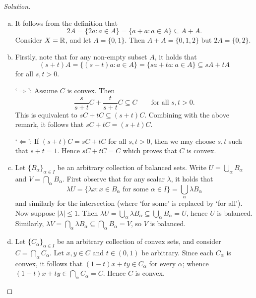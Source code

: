 \begin{proof}[Solution]
	\begin{enumerate}[(a)]
		\item It follows from the definition that
		\begin{equation*}
			2A = \{ 2a : a \in A \} = \{ a+a : a \in A \} \subseteq A+A.
		\end{equation*}
		Consider $X = \mathbb{R}$, and let $A = \{0, 1\}$. Then $A+A = \{0,1,2 \}$ but $2A = \{0,2\}$.
		
		\item Firstly, note that for any non-empty subset $A$, it holds that
		\begin{equation*}
			(s+t)A = \{ (s+t)a : a \in A \} = \{ sa + ta : a \in A \} \subseteq sA + tA
		\end{equation*}
		for all $s,t>0$.
		
		`$\Rightarrow$': Assume $C$ is convex. Then
		\begin{equation*}
			\frac{s}{s+t}C + \frac{t}{s+t}C \subseteq C \qquad \text{for all } s,t>0.
		\end{equation*}
		This is equivalent to $sC + tC \subseteq (s+t)C$. Combining with the above remark, it follows that $sC + tC = (s+t)C$.
		
		`$\Leftarrow$': If $(s+t)C = sC + tC$ for all $s,t>0$, then we may choose $s,t$ such that $s+t=1$. Hence $sC + tC = C$ which proves that $C$ is convex.
		
		\item Let $\{ B_\alpha \}_{\alpha \in I}$ be an arbitrary collection of balanced sets. Write $U = \bigcup_\alpha B_\alpha$ and $V = \bigcap_\alpha B_\alpha$. First observe that for any scalar $\lambda$, it holds that
		\begin{equation*}
			\lambda U = \{ \lambda x : x \in B_\alpha \text{ for some } \alpha \in I \} = \bigcup_\alpha \lambda B_\alpha
		\end{equation*}
		and similarly for the intersection (where `for some' is replaced by `for all'). Now suppose $|\lambda| \le 1$. Then $\lambda U = \bigcup_\alpha \lambda B_\alpha \subseteq \bigcup_\alpha B_\alpha = U$, hence $U$ is balanced. Similarly, $\lambda V = \bigcap_\alpha \lambda B_\alpha \subseteq \bigcap_\alpha B_\alpha = V$, so $V$ is balanced.
		
		\item Let $\{ C_\alpha \}_{\alpha\in I}$ be an arbitrary collection of convex sets, and consider $C = \bigcap_\alpha C_\alpha$. Let $x,y \in C$ and $t \in (0,1)$ be arbitrary. Since each $C_\alpha$ is convex, it follows that $(1-t)x + ty \in C_\alpha$ for every $\alpha$; whence $(1-t)x + ty \in \bigcap_\alpha C_\alpha = C$. Hence $C$ is convex.
		

\end{enumerate}
\end{proof}
